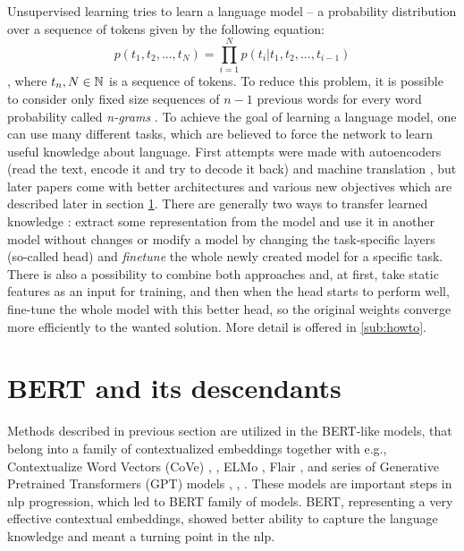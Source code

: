 \par
Unsupervised learning tries to learn a language model -- a probability distribution over a sequence of tokens given by the following equation:
 \begin{equation*}
  p(t_1, t_2,...,t_N) =\prod_{i=1}^{N} p(t_i | t_1, t_2, ..., t_{i-1})
\end{equation*}\citep{Liu2020}, where $t_n, N \in \mathbb{N}$ is a sequence of tokens. To reduce this problem, it is possible to consider only fixed size sequences of $n-1$ previous words for every word probability called \textit{n-grams} \citep{Bengio2003}. To achieve the goal of learning a language model, one can use many different tasks, which are believed to force the network to learn useful knowledge about language. First attempts were made with autoencoders (read the text, encode it and try to decode it back) \citep{Dai2015} and machine translation \citep{Ramachandran2017}, but later papers come with better architectures and various new objectives which are described later in section \ref{sec:bert}.  There are generally two ways to transfer learned knowledge \citep{Feijo2020}: extract some representation from the model and use it in another model without changes or modify a model by changing the task-specific layers (so-called head) and \textit{finetune} the whole newly created model for a specific task. There is also a possibility to combine both approaches and, at first, take static features as an input for training, and then when the head starts to perform well, fine-tune the whole model with this better head, so the original weights converge more efficiently to the wanted solution. More detail is offered in \ref{sub:howto}.
\section{BERT and its descendants}
\label{sec:bert}
Methods described in previous section
are utilized in the BERT-like models, that belong into a family of contextualized embeddings together with e.g., Contextualize Word Vectors (CoVe) \citep{McCann2017}, \citep{Peters2017}, ELMo \citep{Peters2018}, Flair \citep{Akbik2018}, and series of Generative Pretrained Transformers (GPT) models \citep{Radfort2018}, \citep{RadfordAlec2019}, \citep{Brown2020}. These models are important steps in \acrshort{nlp} progression, which led to BERT family of models. BERT, representing a very effective contextual %
 embeddings, showed better ability to capture the language knowledge and meant a turning point in the \acrshort{nlp}.
